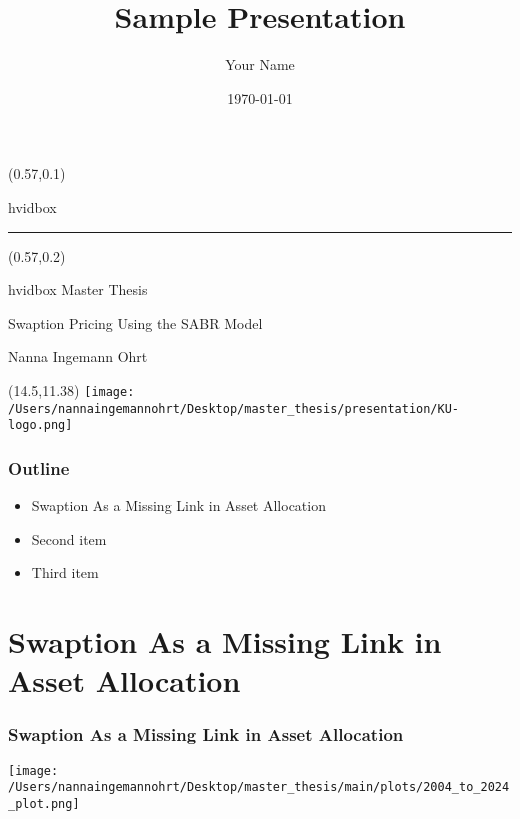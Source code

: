 \documentclass{beamer}
\title{Sample Presentation}
\author{Your Name}
\date{\today}
\begin{document}
\makeatother

{
\begin{frame}[plain] 
    \begin{textblock*}{\textwidth}(0.57\textwidth,0.1\textheight)
        \begin{beamercolorbox}[wd=7.8cm,ht=7.3cm,sep=0.5cm]{hvidbox}
            \fontsize{5}{10}\selectfont {}
            \noindent\textcolor{KUrod}{\rule{6.8cm}{0.4pt}}
        \end{beamercolorbox}
    \end{textblock*}
    \begin{textblock*}{\textwidth}(0.57\textwidth,0.2\textheight) 
        \begin{beamercolorbox}[wd=7.8cm,sep=0.5cm]{hvidbox}
                \Huge \textcolor{KUrod}{Master Thesis}
                \vspace{0.5cm}
                \par
                \Large Swaption Pricing Using the SABR Model
                \vspace{0.5cm}
                \par
                \normalsize Nanna Ingemann Ohrt
        \end{beamercolorbox}
    \end{textblock*}
    \begin{textblock}{1}(14.5,11.38)
        \texttt{[image: /Users/nannaingemannohrt/Desktop/master\_thesis/presentation/KU-logo.png]}
    \end{textblock}
\end{frame}
}

\begin{frame}
    \frametitle{{\textcolor{KUrod}{Outline}}}
    \begin{itemize}[label=\textcolor{KUrod}{\textbullet}]
        \item Swaption As a Missing Link in Asset Allocation
        \item Second item
        \item Third item
    \end{itemize}
\end{frame}
    

\section{Swaption As a Missing Link in Asset Allocation}
\begin{frame}
    \frametitle{\textcolor{KUrod}{Swaption As a Missing Link in Asset Allocation}}
    \begin{center}
        \texttt{[image: /Users/nannaingemannohrt/Desktop/master\_thesis/main/plots/2004\_to\_2024\_plot.png]}
    \end{center}
\end{frame}
\end{document}
